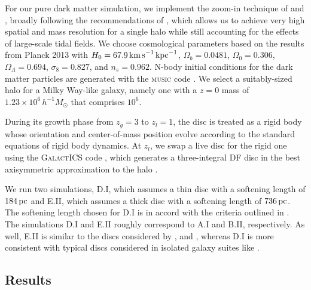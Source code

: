 For our pure dark matter simulation, we implement the zoom-in
technique of \citet{KatzQuasarZoom} and \citet{NavarroWhiteZoom},
broadly following the recommendations of \cite{onorbe_etal_2014},
which allows us to achieve very high spatial and mass resolution for a
single halo while still accounting for the effects of large-scale
tidal fields.  We choose cosmological parameters based on the results
from Planck 2013 \citep{planck_2014} with $H_0=67.9\,{\rm
  km\,s}^{-1}\,{\rm kpc}^{-1}$, $\Omega_b = 0.0481$, $\Omega_0 =
0.306$, $\Omega_\Lambda = 0.694$, $\sigma_8 = 0.827$, and $n_s =
0.962$.  N-body initial conditions for the dark matter particles are
generated with the \textsc{music} code \citep{music}.  
We select a suitably-sized halo for a Milky Way-like galaxy, namely
one with a $z=0$ mass of $1.23\times 10^6\,h^{-1} M_\odot$
that comprises $10^6$.

During its growth phase from $z_g=3$ to $z_l=1$, the disc is treated
as a rigid body whose orientation and center-of-mass position evolve
according to the standard equations of rigid body dynamics.  At
$z_l$, we swap a live disc for the rigid one using the
\textsc{GalactICS} code
\citep{KGGalactICSReference,WPDGalactICSReference}, which generates a
three-integral DF disc in the best axisymmetric approximation to the
halo \citet{Bauer2018a}.

We run two simulations, D.I, which assumes a thin disc with a
softening length of $184\,{\rm pc}$ and E.II, which assumes a thick
disc with a softening length of $736\,{\rm pc}$.  The softening length
chosen for D.I is in accord with the criteria outlined in
\citet{power_et_al_2003}.  The simulations D.I and E.II roughly
correspond to A.I and B.II, respectively.  As well, E.II is similar to
the discs considered by \citet{DeBuhrStellarDisks},
\citet{YurinSpringelStellarDisks} and \citet{Bauer2018a}, whereas D.I
is more consistent with typical discs considered in isolated galaxy
suites like \citet{WPDGalactICSReference}.

\subsection{Results}


